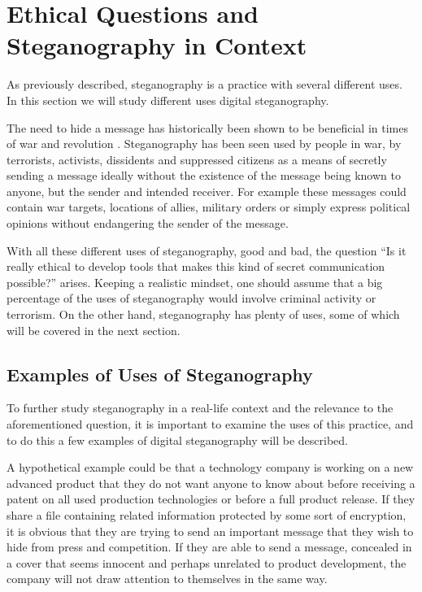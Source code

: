 \section{Ethical Questions and Steganography in Context}
As previously described, steganography is a practice with several different uses.
In this section we will study different uses digital steganography.\vspace*{12pt}

\noindent The need to hide a message has historically been shown to be beneficial in times of war and revolution \citep{Singh2001}.
Steganography has been seen used by people in war, by terrorists, activists, dissidents and suppressed citizens as a means of secretly sending a message ideally without the existence of the message being known to anyone, but the sender and intended receiver.
For example these messages could contain war targets, locations of allies, military orders or simply express political opinions without endangering the sender of the message.

With all these different uses of steganography, good and bad, the question ``Is it really ethical to develop tools that makes this kind of secret communication possible?'' arises.
Keeping a realistic mindset, one should assume that a big percentage of the uses of steganography would involve criminal activity or terrorism.
On the other hand, steganography has plenty of uses, some of which will be covered in the next section.

\subsection{Examples of Uses of Steganography}
To further study steganography in a real-life context and the relevance to the aforementioned question, it is important to examine the uses of this practice, and to do this a few examples of digital steganography will be described.

A hypothetical example could be that a technology company is working on a new advanced product that they do not want anyone to know about before receiving a patent on all used production technologies or before a full product release.
If they share a file containing related information protected by some sort of encryption, it is obvious that they are trying to send an important message that they wish to hide from press and competition.
If they are able to send a message, concealed in a cover that seems innocent and perhaps unrelated to product development, the company will not draw attention to themselves in the same way.

